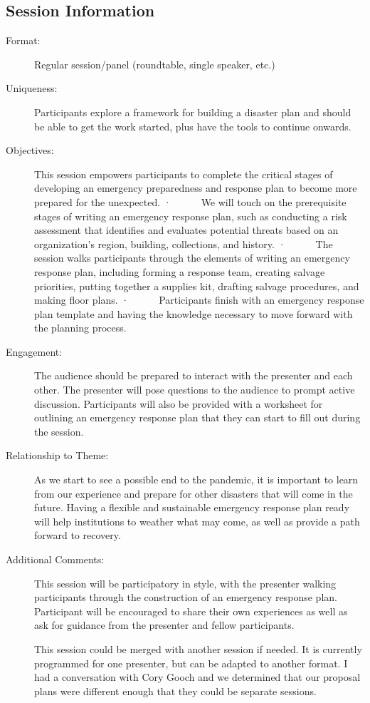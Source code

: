 \documentclass{report}
\begin{document}
              \subsection*{Session Information}
                \begin{description}
                  \item [Format:] Regular session/panel (roundtable, single speaker, etc.)
							    
							    \item [Uniqueness:]Participants explore a framework for building a disaster plan and should be able to get the work started, plus have the tools to continue onwards.
							    \item [Objectives:]This session empowers participants to complete the critical stages of developing an emergency preparedness and response plan to become more prepared for the unexpected.
·      We will touch on the prerequisite stages of writing an emergency response plan, such as conducting a risk assessment that identifies and evaluates potential threats based on an organization’s region, building, collections, and history. 
·      The session walks participants through the elements of writing an emergency response plan, including forming a response team, creating salvage priorities, putting together a supplies kit, drafting salvage procedures, and making floor plans. 
·      Participants finish with an emergency response plan template and having the knowledge necessary to move forward with the planning process.
							    \item [Engagement:]The audience should be prepared to interact with the presenter and each other. The presenter will pose questions to the audience to prompt active discussion. Participants will also be provided with a worksheet for outlining an emergency response plan that they can start to fill out during the session.
							    \item [Relationship to Theme:]As we start to see a possible end to the pandemic, it is important to learn from our experience and prepare for other disasters that will come in the future. Having a flexible and sustainable emergency response plan ready will help institutions to weather what may come, as well as provide a path forward to recovery.
							    
                    \item [Additional Comments: ]This session will be participatory in style, with the presenter walking participants through the construction of an emergency response plan. Participant will be encouraged to share their own experiences as well as ask for guidance from the presenter and fellow participants.

This session could be merged with another session if needed. It is currently programmed for one presenter, but can be adapted to another format. I had a conversation with Cory Gooch and we determined that our proposal plans were different enough that they could be separate sessions.

                \end{description}
\end{document}
